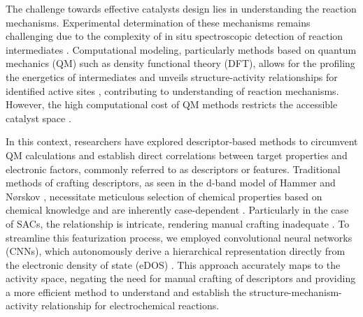 The challenge towards effective catalysts design lies in understanding the reaction mechanisms.
Experimental determination of these mechanisms remains challenging due to the complexity of in situ spectroscopic detection of reaction intermediates \cite{zhao2021revisiting}.
Computational modeling, particularly methods based on quantum mechanics (QM) such as density functional theory (DFT),
allows for the profiling the energetics of intermediates and unveils structure-activity relationships for identified active sites \cite{feaster2017understanding, carter2008challenges}, contributing to understanding of reaction mechanisms.
However, the high computational cost of QM methods restricts the accessible catalyst space \cite{jinnouchi2017predicting, cuenya2015nanocatalysis, goldsmith2018machine}.

In this context, researchers have explored descriptor-based methods to circumvent QM calculations and establish direct correlations between target properties and electronic factors, commonly referred to as descriptors or features.
Traditional methods of crafting descriptors, as seen in the d-band model of Hammer and Nørskov \cite{hammer1995electronic}, necessitate meticulous selection of chemical properties based on chemical knowledge and are inherently case-dependent \cite{kajita2017universal}.
Particularly in the case of SACs, the relationship is intricate, rendering manual crafting inadequate \cite{han2021single, thirumalai2018investigating}.
To streamline this featurization process, we employed convolutional neural networks (CNNs), which autonomously derive a hierarchical representation directly from the electronic density of state (eDOS) \cite{tran2015learning, socher2012convolutional, krizhevsky2012imagenet}.
This approach accurately maps to the activity space, negating the need for manual crafting of descriptors and providing a more efficient method to understand and establish the structure-mechanism-activity relationship for electrochemical reactions.

